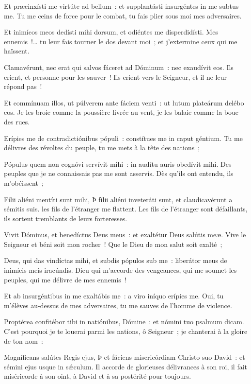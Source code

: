 \begin{paracol}{2}

\LigneParacol{0cm}
{Et præcinxísti me virtúte ad bellum~: \GreStar{} et supplantásti insurgéntes in me subtus me.}
{Tu me ceins de force pour le combat, tu fais plier sous moi mes adversaires. }

\LigneParacol{0.2cm}
{Et inimícos meos dedísti mihi dorsum, \GreStar{} et odiéntes me disperdidísti.}
{Mes ennemis~!… tu leur fais tourner le dos devant moi~; et j'extermine ceux qui me haïssent. }

\LigneParacol{0.2cm}
{Clamavérunt, nec erat qui salvos fáceret ad Dóminum~: \GreStar{} nec exaudívit eos.}
{Ils crient, et personne pour les sauver~! Ils crient vers le Seigneur, et il ne leur répond pas~! }

\LigneParacol{0.2cm}
{Et commínuam illos, ut púlverem ante fáciem venti~: \GreStar{} ut lutum plateárum delébo eos.}
{Je les broie comme la poussière livrée au vent, je les balaie comme la boue des rues. }

\LigneParacol{0.2cm}
{Erípies me de contradictiónibus pópuli~: \GreStar{} constítues me in caput géntium.}
{Tu me délivres des révoltes du peuple, tu me mets à la tête des nations~;}

\LigneParacol{0.2cm}
{Pópulus quem non cognóvi servívit mihi~: \GreStar{} in audítu auris obedívit mihi.}
{Des peuples que je ne connaissais pas me sont asservis. Dès qu'ils ont entendu, ils m'obéissent~;}

\LigneParacol{0.2cm}
{Fílii aliéni mentíti sunt mihi, Þ fílii aliéni inveteráti sunt, \GreStar{} et claudicavérunt a sémitis suis.}
{les fils de l'étranger me flattent. Les fils de l'étranger sont défaillants, ils sortent tremblants de leurs forteresses. }

\end{paracol}
\Gloria
\begin{paracol}{2}

\LigneParacol{0cm}
{Vivit Dóminus, et benedíctus Deus meus~: \GreStar{} et exaltétur Deus salútis meæ.}
{Vive le Seigneur et béni soit mon rocher~! Que le Dieu de mon salut soit exalté~; }

\LigneParacol{0.2cm}
{Deus, qui das vindíctas mihi, et subdis pópulos sub me~: \GreStar{} liberátor meus de inimícis meis iracúndis.}
{Dieu qui m'accorde des vengeances, qui me soumet les peuples, qui me délivre de mes ennemis~!}

\LigneParacol{0.2cm}
{Et ab insurgéntibus in me exaltábis me~: \GreStar{} a viro iníquo erípies me.}
{Oui, tu m'élèves au-dessus de mes adversaires, tu me sauves de l'homme de violence. }

\LigneParacol{0.2cm}
{Proptérea confitébor tibi in natiónibus, Dómine~: \GreStar{} et nómini tuo psalmum dicam.}
{C'est pourquoi je te louerai parmi les nations, ô Seigneur~; je chanterai à la gloire de ton nom~:}

\LigneParacol{0.2cm}
{Magníficans salútes Regis ejus, Þ et fáciens misericórdiam Christo suo David~: \GreStar{} et sémini ejus usque in sǽculum.}
{Il accorde de glorieuses délivrances à son roi, il fait miséricorde à son oint, à David et à sa postérité pour toujours. }

\end{paracol}
